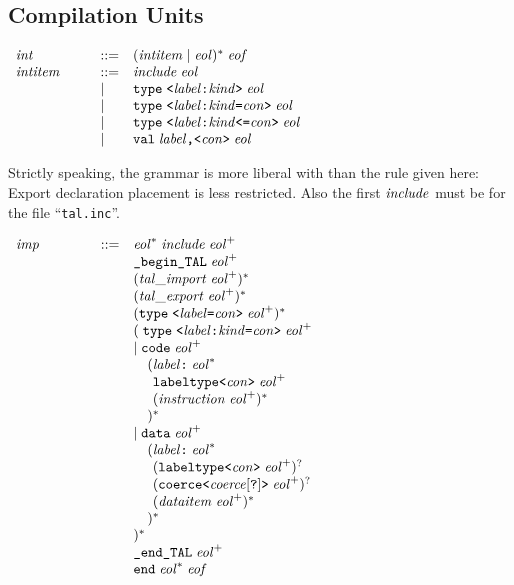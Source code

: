 \documentclass{article}
\newenvironment{gramrule}
  {\begin{flushleft}$\begin{array}{p{0.7in}ll}}
  {\end{array}$\end{flushleft}}
\newcommand{\nterm}[1]{{\it#1}}
\newcommand{\term}[1]{{\it#1}}
\newcommand{\ts}[1]{\hbox{\tt#1}}
\newcommand{\alt}{\mathrel{|}}
\begin{document}
\subsection{Compilation Units}
\begin{gramrule}
\nterm{int} &::=& (\nterm{intitem} \alt \term{eol})^* \; \term{eof} \\
\nterm{intitem} &::=& \term{include} \; \term{eol} \\
&|& \ts{type} \; \ts{<} \nterm{label} \ts{:} \nterm{kind} \ts{>}\;\term{eol} \\
&|& \ts{type} \; \ts{<} \nterm{label} \ts{:} \nterm{kind} \ts{=} \nterm{con}
     \ts{>}\;\term{eol} \\
&|& \ts{type} \; \ts{<} \nterm{label} \ts{:} \nterm{kind} \ts{<=} \nterm{con}
     \ts{>}\;\term{eol} \\
&|& \ts{val} \; \nterm{label} \ts{,} \ts{<} \nterm{con} \ts{>} \; \term{eol}
\end{gramrule}
Strictly speaking, the grammar is more liberal with than the rule given here:
Export declaration placement is less restricted.  Also the first
$\term{include}$ must be for the file ``{\tt tal.inc}''.
\begin{gramrule}
\nterm{imp} &::=& \term{eol}^* \; \term{include} \; \term{eol}^+ \\
&& \ts{\_begin\_TAL} \; \term{eol}^+ \\
&& (\term{tal\_import} \; \term{eol}^+)^* \\
&& (\term{tal\_export} \; \term{eol}^+)^* \\
&& (\ts{type} \; \ts< \nterm{label} \ts{=} \nterm{con} \ts{>} \;
   \term{eol}^+)^* \\ 
&& ( \; \ts{type} \; \ts< \nterm{label} \ts{:} \nterm{kind} \ts{=} \nterm{con}
     \ts{>} \; \term{eol}^+ \\
&& | \; \ts{code} \; \term{eol}^+ \\
&& \quad (\nterm{label} \ts{:} \; \term{eol}^* \\
&& \quad \phantom{(} \ts{labeltype} \ts{<} \nterm{con} \ts{>} \;\term{eol}^+ \\
&& \quad \phantom{(} (\nterm{instruction}\;\term{eol}^+)^* \\
&& \quad )^* \\
&& | \; \ts{data} \; \term{eol}^+ \\
&& \quad (\nterm{label} \ts{:} \; \term{eol}^* \\
&& \quad \phantom{(} (\ts{labeltype} \ts{<} \nterm{con} \ts{>} \;
                      \term{eol}^+)^? \\
&& \quad \phantom{(} (\ts{coerce} \ts{<} \nterm{coerce}[\ts{?}] \ts{>} \;
                      \term{eol}^+)^? \\
&& \quad \phantom{(} (\nterm{dataitem}\;\term{eol}^+)^* \\
&& \quad )^* \\
&& )^* \\
&& \ts{\_end\_TAL} \; \term{eol}^+ \\
&& \ts{end} \; \term{eol}^* \; \term{eof}
\end{gramrule}
\end{document}
